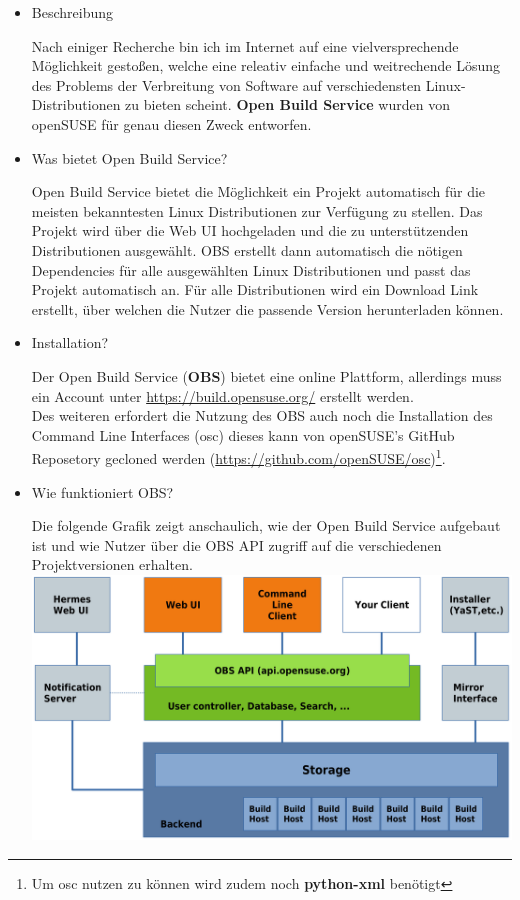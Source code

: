 
	\begin{itemize}
	\item Beschreibung
	
	
	Nach einiger Recherche bin ich im Internet auf eine vielversprechende Möglichkeit gestoßen, welche eine releativ einfache und weitrechende Lösung des Problems der Verbreitung von Software auf verschiedensten Linux-Distributionen zu bieten scheint.
	\textbf{Open Build Service} wurden von openSUSE für genau diesen Zweck entworfen.
	
	\item Was bietet Open Build Service?
	
	Open Build Service bietet die Möglichkeit ein Projekt automatisch für die meisten bekanntesten Linux Distributionen zur Verfügung zu stellen. Das Projekt wird über die Web UI hochgeladen und die zu unterstützenden Distributionen ausgewählt. OBS erstellt dann automatisch die nötigen Dependencies für alle ausgewählten Linux Distributionen und passt das Projekt automatisch an. Für alle Distributionen wird ein Download Link erstellt, über welchen die Nutzer die passende Version herunterladen können.
	
	\item Installation?
	
	Der Open Build Service (\textbf{OBS}) bietet eine online Plattform,
	allerdings muss ein Account unter \url{https://build.opensuse.org/} erstellt werden. \\
	Des weiteren erfordert die Nutzung des OBS auch noch die Installation des Command Line Interfaces (osc) dieses kann von openSUSE's GitHub Reposetory gecloned werden (\url{https://github.com/openSUSE/osc})\footnote{Um osc nutzen zu können wird zudem noch \textbf{python-xml} benötigt}.
	
	\item Wie funktioniert OBS?
	
	Die folgende Grafik zeigt anschaulich, wie der Open Build Service aufgebaut ist und wie Nutzer über die OBS API zugriff auf die verschiedenen Projektversionen erhalten.\\
	
	\includegraphics[width=\textwidth]{Bilder/obs-concept.jpg}\\
	

\end{itemize}
